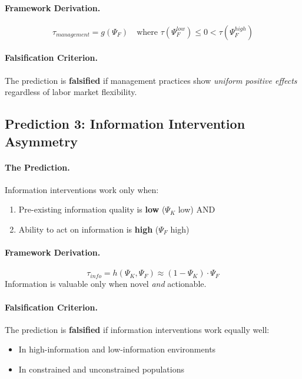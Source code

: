 \documentclass[12pt,a4paper]{article}
\begin{document}
\paragraph{Framework Derivation.}
\begin{equation}
    \tau_{management} = g(\Psi_F) \quad \text{where } \tau(\Psi_F^{low}) \leq 0 < \tau(\Psi_F^{high})
\end{equation}

\paragraph{Falsification Criterion.}
The prediction is \textbf{falsified} if management practices show \textit{uniform positive effects} regardless of labor market flexibility.

\subsection{Prediction 3: Information Intervention Asymmetry}

\paragraph{The Prediction.}
Information interventions work only when:
\begin{enumerate}
    \item Pre-existing information quality is \textbf{low} ($\Psi_K$ low) AND
    \item Ability to act on information is \textbf{high} ($\Psi_F$ high)
\end{enumerate}

\paragraph{Framework Derivation.}
\begin{equation}
    \tau_{info} = h(\Psi_K, \Psi_F) \approx (1 - \Psi_K) \cdot \Psi_F
\end{equation}
Information is valuable only when novel \textit{and} actionable.

\paragraph{Falsification Criterion.}
The prediction is \textbf{falsified} if information interventions work equally well:
\begin{itemize}
    \item In high-information and low-information environments
    \item In constrained and unconstrained populations
\end{itemize}
\end{document}
